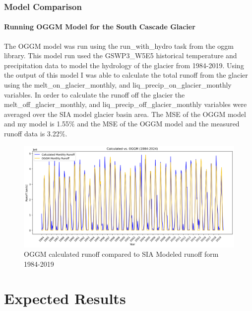 \documentclass{article}
\begin{document}
\subsubsection{Model Comparison}
\paragraph{Running OGGM Model for the South Cascade Glacier}

The OGGM model was run using the run\_with\_hydro task from the oggm library. This model run used the GSWP3\_W5E5 historical temperature and 
precipitation data \cite{ref10} to model the hydrology of the glacier from 1984-2019. Using the output of this model I was able to calculate the total 
runoff from the glacier using the melt\_on\_glacier\_monthly, and liq\_precip\_on\_glacier\_monthly variables. In order 
to calculate the runoff off the glacier the melt\_off\_glacier\_monthly, and liq\_precip\_off\_glacier\_monthly variables were averaged over the 
SIA model glacier basin area. The MSE of the OGGM model and my model is 1.55\% and the MSE of the OGGM model and the measured runoff data is 3.22\%.

\begin{figure}[h!]
    \includegraphics[width=1.3\textwidth]{Plots/oggm_vs_calculated.png}
    \caption{OGGM calculated runoff compared to SIA Modeled runoff form 1984-2019}
    \label{fig:oggm_model_run_1984_2019}
\end{figure}
\FloatBarrier

\section{Expected Results}
\end{document}
